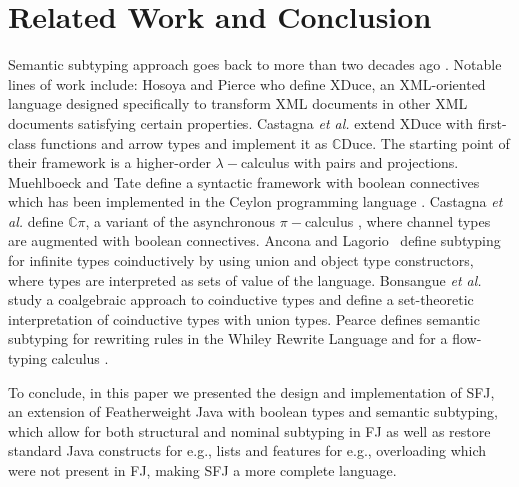 \documentclass[runningheads]{llncs}
\begin{document}
\section{Related Work and Conclusion}
\label{sec:conclusion}
Semantic subtyping approach goes back to more than two decades ago \cite{Aiken,Damm}.
Notable lines of work include:
Hosoya and Pierce \cite{XML1,XML2,XML3} who define XDuce, an XML-oriented language designed specifically to transform XML documents in other XML documents satisfying certain properties.
Castagna \emph{et al.} \cite{gentle,Cas05,FCB08} extend XDuce with first-class functions and arrow types and implement it as $\mathbb{C}$Duce. The starting point of their framework is a higher-order $\lambda-$calculus with pairs and projections.
Muehlboeck and Tate \cite{Muehlboeck2018} define a syntactic framework with boolean connectives which has been implemented in the Ceylon programming language \cite{Ceylon2016}.
Castagna \emph{et al.} \cite{Cpi} define $\mathbb{C}\pi$, a variant of the asynchronous $\pi-$calculus \cite{sangiorgi}, where channel types are augmented with boolean connectives.
Ancona and Lagorio~\cite{AL10} define subtyping for infinite types coinductively by using union and object type constructors, where types are interpreted as sets of value of the language.
Bonsangue \emph{et al.}~\cite{BRABR14} study a coalgebraic approach to coinductive types and define a set-theoretic interpretation of coinductive types with union types.
Pearce \cite{Pearce19} defines semantic subtyping for rewriting rules in the Whiley Rewrite Language and for a flow-typing calculus  \cite{Pearce13}.

To conclude, in this paper we presented the design and implementation of SFJ, an extension of Featherweight Java with boolean types and semantic subtyping, which allow for both structural and nominal subtyping in FJ as well as restore standard Java constructs for e.g., lists and features for e.g., overloading which were not present in FJ, making SFJ a more complete language.

\newpage


\end{document}
